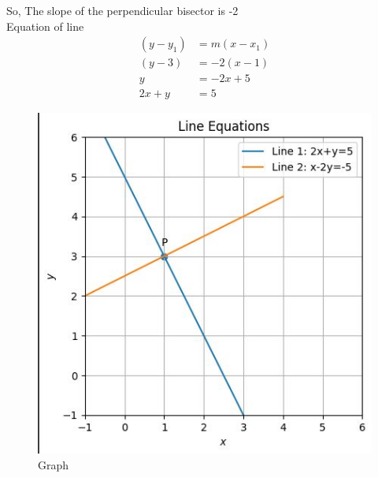 \documentclass[12pt]{article}
\begin{document}
So, The slope of the perpendicular bisector is -2\\
Equation of line
\begin{align}
    ( y - y_1 ) &= m ( x - x_1)\\
    ( y - 3 ) &= -2 ( x - 1 )\\
    y &= - 2x + 5\\
    2x + y &= 5
\end{align}
\begin{figure}[H]
  \centering
  \includegraphics[width=\columnwidth]{figs/graph.jpg}
  \caption{Graph}
  \label{fig:pic}
\end{figure}
\end{document}
